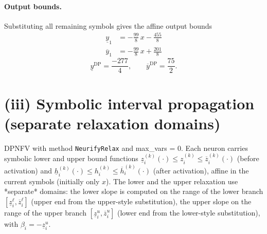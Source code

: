 \documentclass[11pt]{article}
\begin{document}
\paragraph{Output bounds.}
Substituting all remaining symbols gives the affine output bounds
\begin{align*}
\underline{y}_{1} &= -\frac{99}{8}\,x - \frac{455}{8}
\end{align*}
\begin{align*}
\overline{y}_{1} &= -\frac{99}{8}\,x + \frac{201}{8}
\end{align*}
\begin{equation*}
\underline{y}^{\text{DP}} = \frac{-277}{4}, \qquad \overline{y}^{\text{DP}} = \frac{75}{2}.
\end{equation*}

\section{(iii) Symbolic interval propagation (separate relaxation domains)}
DPNFV with method \texttt{NeurifyRelax} and max\_vars = 0. Each neuron carries symbolic lower and upper bound functions
$\underline{z}^{(k)}_i(\cdot) \le z^{(k)}_i \le \overline{z}^{(k)}_i(\cdot)$ (before activation)
and $\underline{h}^{(k)}_i(\cdot) \le h^{(k)}_i \le \overline{h}^{(k)}_i(\cdot)$ (after activation),
affine in the current symbols (initially only $x$).
The lower and the upper relaxation use *separate* domains:
the lower slope is computed on the range of the lower branch
$[\underline{z}^{\ell}_i, \overline{z}^{\ell}_i]$ (upper end from the upper-style substitution),
the upper slope on the range of the upper branch
$[\underline{z}^{u}_i, \overline{z}^{u}_i]$ (lower end from the lower-style substitution),
with $\beta_i = -\underline{z}^{u}_i$.
\end{document}
